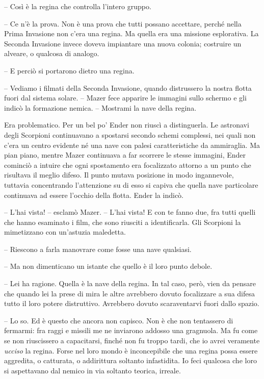 {-- Così è la regina che controlla l'intero gruppo.}

{-- Ce n'è la prova. Non è una prova che tutti possano accettare, perché
	nella Prima Invasione non c'era una regina. Ma quella era una missione
	esplorativa. La Seconda Invasione invece doveva impiantare una nuova
	colonia; costruire un alveare, o qualcosa di analogo.}

{-- E perciò si portarono dietro una regina.}

{-- Vediamo i filmati della Seconda Invasione, quando distrussero la
	nostra flotta fuori dal sistema solare. -- Mazer fece apparire le
	immagini sullo schermo e gli indicò la formazione nemica. -- Mostrami la
	nave della regina.}

{Era problematico. Per un bel po' Ender non riuscì a distinguerla. Le
	astronavi degli Scorpioni continuavano a spostarsi secondo schemi
	complessi, nei quali non c'era un centro evidente né una nave con palesi
	caratteristiche da ammiraglia. Ma pian piano, mentre Mazer continuava a
	far scorrere le stesse immagini, Ender cominciò a intuire che ogni
	spostamento era focalizzato attorno a un punto che risultava il meglio
	difeso. Il punto mutava posizione in modo ingannevole, tuttavia
	concentrando l'attenzione su di esso si capiva che quella nave
	particolare continuava ad essere l'occhio della flotta. Ender la
	indicò.}

{-- L'hai vista! -- esclamò Mazer. -- L'hai vista! E con te fanno due,
	fra tutti quelli che hanno esaminato i film, che sono riusciti a
	identificarla. Gli Scorpioni la mimetizzano con un'astuzia maledetta.}

{-- Riescono a farla manovrare come fosse una nave qualsiasi.}

{-- Ma non dimenticano un istante che quello è il loro punto debole.}

{-- Lei ha ragione. Quella è la nave della regina. In tal caso, però,
	vien da pensare che quando lei la prese di mira le altre avrebbero
	dovuto focalizzare a sua difesa tutto il loro potere distruttivo.
	Avrebbero dovuto scaraventarvi fuori dallo spazio.}

{-- Lo so. Ed è questo che ancora non capisco. Non è che non tentassero
	di fermarmi: fra raggi e missili me ne inviarono addosso una gragnuola.
	Ma fu come se non riuscissero a capacitarsi, finché non fu troppo tardi,
	che io avrei veramente \emph{ucciso} la regina. Forse nel loro mondo è
	inconcepibile che una regina possa essere aggredita, o catturata, o
	addirittura soltanto infastidita. Io feci qualcosa che loro si
	aspettavano dal nemico in via soltanto teorica, irreale.}

